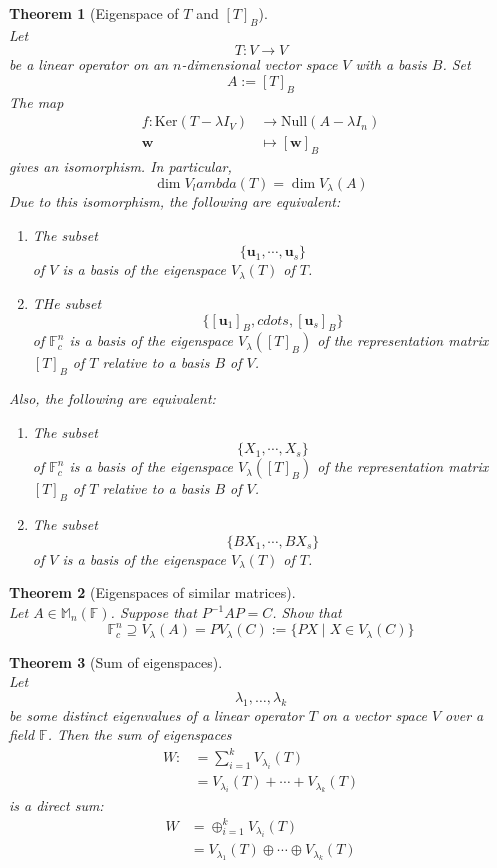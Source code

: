 \documentclass[12pt]{article}
\newcommand{\kerne}{\mathrm{Ker}}
\newcommand{\nul}{\mathrm{Null}}
\newtheorem{theorem}{Theorem}[section]
\theoremstyle{definition}
\begin{document}
\begin{theorem}[{Eigenspace of $T$ and $[T]_B$}]
\hfill\\\normalfont
Let
\[
T:V\to V
\]
be a linear operator on an $n$-dimensional vector space $V$ with a basis $B$. Set
\[
A:=[T]_B
\]
The map
\[
\begin{aligned}
f:\kerne(T-\lambda I_V)&\to\nul(A-\lambda I_n)\\
\mathbf{w}&\mapsto[\mathbf{w}]_B
\end{aligned}
\]
gives an isomorphism. In particular,
\[
\dim V_lambda(T)=\dim V_\lambda(A)
\]
Due to this isomorphism, the following are equivalent:
\begin{enumerate}
\item The subset
\[
\{\mathbf{u}_1,\cdots, \mathbf{u}_s\}
\]
of $V$ is a basis of the eigenspace $V_\lambda(T)$ of $T$.
\item THe subset
\[
\{[\mathbf{u}_1]_B,cdots,[\mathbf{u}_s]_B\}
\]
of $\mathbb{F}_c^n$ is a basis of the eigenspace $V_\lambda([T]_B)$ of the representation matrix $[T]_B$ of $T$ relative to a basis $B$ of $V$.
\end{enumerate}
Also, the following are equivalent:
\begin{enumerate}
\item The subset
\[
\{X_1,\cdots, X_s\}
\]
of $\mathbb{F}^n_c$ is a basis of the eigenspace $V_\lambda([T]_B)$ of the representation matrix $[T]_B$ of $T$ relative to a basis $B$ of $V$.
\item The subset
\[
\{BX_1, \cdots,BX_s\}
\]
of $V$ is a basis of the eigenspace $V_\lambda(T)$ of $T$.
\end{enumerate}
\end{theorem}
\begin{theorem}[Eigenspaces of similar matrices]
\hfill\\\normalfont Let $A\in\mathbb{M}_n(\mathbb{F})$. Suppose that $P^{-1}AP=C$. Show that
\[
\mathbb{F}^n_c\supseteq V_\lambda(A)=PV_\lambda(C):=\{PX\mid X\in V_\lambda(C)\}
\]
\end{theorem}
\begin{theorem}[Sum of eigenspaces]
\hfill\\\normalfont Let
\[
\lambda_1,\ldots,\lambda_k
\]
be some distinct eigenvalues of a linear operator $T$ on a vector space $V$ over a field $\mathbb{F}$. Then the sum of eigenspaces
\[
\begin{aligned}
W:&=\sum_{i=1}^kV_{\lambda_i}(T)\\
&=V_{\lambda_i}(T)+\cdots+V_{\lambda_k}(T)
\end{aligned}
\]
is a direct sum:
\[
\begin{aligned}
W&=\oplus_{i=1}^k V_{\lambda_i}(T)\\
&=V_{\lambda_1}(T)\oplus\cdots\oplus V_{\lambda_k}(T)
\end{aligned}
\]
\end{theorem}
\end{document}
